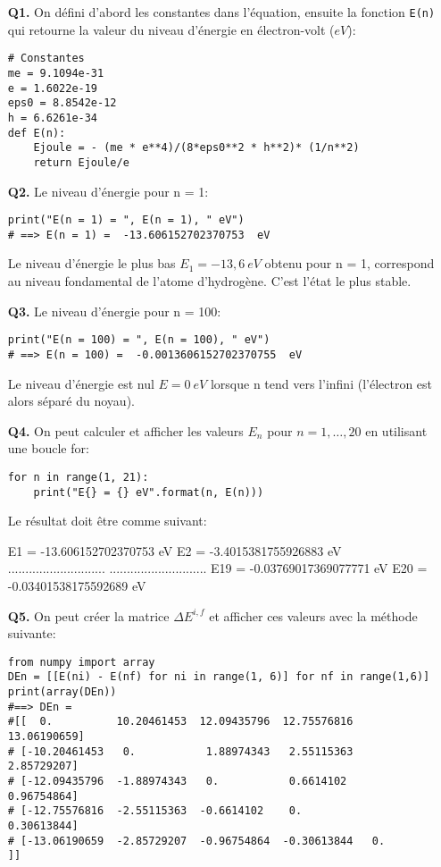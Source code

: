 \documentclass[a4paper,11pt]{article}
\theoremstyle{mytheor}
\begin{document}
\begin{itemize}
\item[\textbf{Q1.}] On défini d'abord les constantes dans l'équation, ensuite la fonction \texttt{E(n)} qui retourne la valeur du niveau d’énergie en électron-volt ($eV$):
\begin{lstlisting}
# Constantes
me = 9.1094e-31
e = 1.6022e-19
eps0 = 8.8542e-12
h = 6.6261e-34
def E(n):
    Ejoule = - (me * e**4)/(8*eps0**2 * h**2)* (1/n**2)
    return Ejoule/e
\end{lstlisting}


\item[\textbf{Q2.}] Le niveau d'énergie pour n = 1:
\begin{lstlisting}
print("E(n = 1) = ", E(n = 1), " eV")
# ==> E(n = 1) =  -13.606152702370753  eV
\end{lstlisting}
\noindent
Le niveau d'énergie le plus bas $E_1 = - 13,6 \ eV$ obtenu pour n = 1, correspond au niveau fondamental de l'atome d'hydrogène. C'est l'état le plus stable.

\item[\textbf{Q3.}] Le niveau d'énergie pour n = 100:
\begin{lstlisting}
print("E(n = 100) = ", E(n = 100), " eV")
# ==> E(n = 100) =  -0.0013606152702370755  eV
\end{lstlisting}
Le niveau d'énergie est nul $E = 0 \ eV$  lorsque n tend vers l'infini (l'électron est alors séparé du noyau).

\item[\textbf{Q4.}] On peut calculer et afficher les valeurs $E_n$ pour $n = 1,…, 20$ en utilisant une boucle for:
\begin{lstlisting}
for n in range(1, 21):
    print("E{} = {} eV".format(n, E(n)))
\end{lstlisting}
Le résultat doit être comme suivant:
\begin{pyshell}
E1 = -13.606152702370753 eV
E2 = -3.4015381755926883 eV
............................
............................
E19 = -0.03769017369077771 eV
E20 = -0.03401538175592689 eV
\end{pyshell}
\item[\textbf{Q5.}] On peut créer la matrice $\Delta E^{i,f}$ et afficher ces valeurs avec la méthode suivante:

\begin{lstlisting}
from numpy import array
DEn = [[E(ni) - E(nf) for ni in range(1, 6)] for nf in range(1,6)]
print(array(DEn))
#==> DEn =
#[[  0.          10.20461453  12.09435796  12.75576816  13.06190659]
# [-10.20461453   0.           1.88974343   2.55115363   2.85729207]
# [-12.09435796  -1.88974343   0.           0.6614102    0.96754864]
# [-12.75576816  -2.55115363  -0.6614102    0.           0.30613844]
# [-13.06190659  -2.85729207  -0.96754864  -0.30613844   0.        ]]
\end{lstlisting}
\end{itemize}
\end{document}
